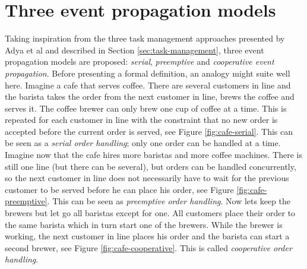 \section{Three event propagation models}

Taking inspiration from the three task management approaches presented by Adya
et al \cite{adya2002cooperative} and described in Section
\ref{sec:task-management}, three event propagation models are proposed:
\textit{serial}, \textit{preemptive} and \textit{cooperative event
propagation}. Before presenting a formal definition, an analogy might suite
well here. Imagine a cafe that serves coffee. There are several customers in
line and the barista takes the order from the next customer in line, brews the
coffee and serves it. The coffee brewer can only brew one cup of coffee at a
time. This is repeated for each customer in line with the constraint that no
new order is accepted before the current order is served, see Figure
\ref{fig:cafe-serial}. This can be seen as a \textit{serial order handling};
only one order can be handled at a time. Imagine now that the cafe hires more
baristas and more coffee machines. There is still one line (but there can be
several), but orders can be handled concurrently, so the next customer in line
does not necessarily have to wait for the previous customer to be served before
he can place his order, see Figure \ref{fig:cafe-preemptive}. This can be seen
as \textit{preemptive order handling}. Now lets keep the brewers but let go all
baristas except for one.  All customers place their order to the same barista
which in turn start one of the brewers. While the brewer is working, the next
customer in line places his order and the barista can start a second brewer,
see Figure \ref{fig:cafe-cooperative}. This is called \textit{cooperative order
handling}.

